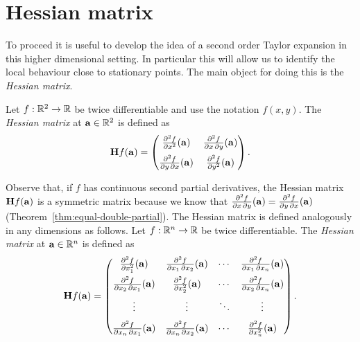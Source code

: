 \section{Hessian matrix}

To proceed it is useful to develop the idea of a second order Taylor expansion in this higher dimensional setting.
In particular this will allow us to identify the local behaviour close to stationary points.
The main object for doing this is the \emph{Hessian matrix}.

\begin{definition}
    Let \(f:\bR^2 \to\bR\) be twice differentiable and use the notation \(f(x,y)\).
    The \emph{Hessian matrix} at \(\aa\in \bR^2\) is defined as
    \[
        \mathbf{H} f (\aa)= \begin{pmatrix}
            \frac{\partial^2 f}{\partial x^2} (\aa)
             & \frac{\partial^2 f}{\partial x\,\partial y} (\aa)
            \\[1.5ex]
            \frac{\partial^2 f}{\partial y\,\partial x} (\aa)
             & \frac{\partial^2 f}{\partial y^2}(\aa)
        \end{pmatrix}.
    \]
\end{definition}

Observe that, if $f$ has continuous second partial derivatives, the Hessian matrix \(\mathbf{H} f (\aa)\) is a symmetric matrix 
because we know that \(\frac{\partial^2 f}{\partial x\,\partial y} (\aa) = \frac{\partial^2 f}{\partial y\,\partial x} (\aa)\) 
(Theorem~\ref{thm:equal-double-partial}).
The Hessian matrix is defined analogously in any dimensions as follows.
Let \(f:\bR^n \to\bR\) be twice differentiable.
The \emph{Hessian matrix} at \(\aa\in \bR^n\) is defined as
\[
    \mathbf{H} f (\aa)= \begin{pmatrix}
        \frac{\partial^2 f}{\partial x_1^2} (\aa)
         & \frac{\partial^2 f}{\partial x_1\,\partial x_2} (\aa)
         & \cdots
         & \frac{\partial^2 f}{\partial x_1\,\partial x_n}(\aa)  \\[1.5ex]
        \frac{\partial^2 f}{\partial x_2\,\partial x_1} (\aa)
         & \frac{\partial^2 f}{\partial x_2^2}(\aa)
         & \cdots
         & \frac{\partial^2 f}{\partial x_2\,\partial x_n}(\aa)  \\[1.5ex]
        \vdots
         & \vdots
         & \ddots
         & \vdots                                                \\[1.5ex]
        \frac{\partial^2 f}{\partial x_n\,\partial x_1} (\aa)
         & \frac{\partial^2 f}{\partial x_n\,\partial x_2} (\aa)
         & \cdots
         & \frac{\partial^2 f}{\partial x_n^2}(\aa)
    \end{pmatrix}.
\]


